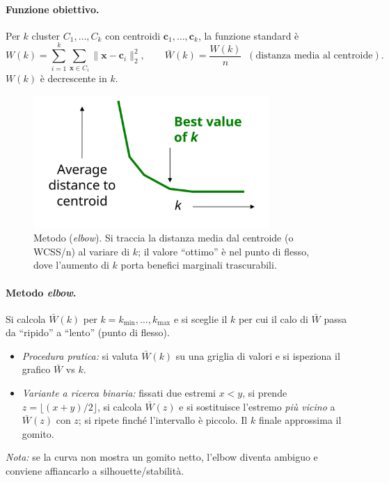 \paragraph{Funzione obiettivo.}
Per $k$ cluster $C_1,\dots,C_k$ con centroidi $\mathbf{c}_1,\dots,\mathbf{c}_k$, la funzione standard è
\[
W(k)=\sum_{i=1}^k \sum_{\mathbf{x}\in C_i}\|\mathbf{x}-\mathbf{c}_i\|_2^2,\qquad 
\bar W(k)=\frac{W(k)}{n}\;\;(\text{distanza media al centroide}).
\]
$W(k)$ è decrescente in $k$.

\begin{figure}[htbp]
  \centering
  \includegraphics[width=0.8\textwidth]{images/elbow-k.png}
  \caption{Metodo (\emph{elbow}). Si traccia la distanza media dal centroide (o WCSS/n) al variare di $k$; il valore “ottimo” è nel punto di flesso, dove l’aumento di $k$ porta benefici marginali trascurabili.}
  \label{fig:elbow}
\end{figure}

\paragraph{Metodo \emph{elbow}.}
Si calcola $\bar W(k)$ per $k=k_{\min},\dots,k_{\max}$ e si sceglie il $k$ per cui il calo di $\bar W$ passa da “ripido” a “lento” (punto di flesso).
\begin{itemize}
  \item \emph{Procedura pratica:} si valuta $\bar W(k)$ su una griglia di valori e si ispeziona il grafico $\bar W$ vs $k$.
  \item \emph{Variante a ricerca binaria:} fissati due estremi $x<y$, si prende $z=\lfloor(x+y)/2\rfloor$, si calcola $\bar W(z)$ e si sostituisce l’estremo \emph{più vicino} a $\bar W(z)$ con $z$; si ripete finché l’intervallo è piccolo. Il $k$ finale approssima il gomito.
\end{itemize}
\emph{Nota:} se la curva non mostra un gomito netto, l’elbow diventa ambiguo e conviene affiancarlo a silhouette/stabilità.



